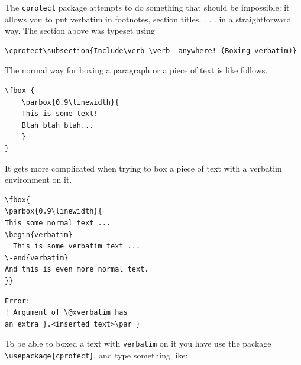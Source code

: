 \documentclass[12pt,a4paper]{article}
\theoremstyle{definition}
\theoremstyle{remark}
\newcommand{\bs}{\bigskip}
\newcommand{\tbs}{\textbackslash}
\begin{document}
The \texttt{cprotect} package attempts to do something that should be impossible: it allows you
to put verbatim in footnotes, section titles, . . . in a straightforward way. The section above was typeset using

\begin{verbatim}
\cprotect\subsection{Include\verb-\verb- anywhere! (Boxing verbatim)}
\end{verbatim}

The normal way for boxing a paragraph or a piece of text is like follows.
\bs

\begin{minipage}{0.45\textwidth}
\begin{verbatim}
\fbox {
    \parbox{0.9\linewidth}{
    This is some text!
    Blah blah blah...
    }
}
\end{verbatim}
\end{minipage}
\hfill\vline\hfill
\begin{minipage}[c]{0.3\textwidth}
\end{minipage}
\bs

It gets more complicated when trying to box a piece of text with a verbatim environment on it.
\bigskip 

\begin{minipage}{0.55\textwidth}
\begin{verbatim}
\fbox{
\parbox{0.9\linewidth}{
This some normal text ...
\begin{verbatim}
  This is some verbatim text ...
\-end{verbatim}
And this is even more normal text.
}}
\end{verbatim}
\end{minipage}
\vline\hfill
\begin{minipage}[c]{0.35\textwidth}
\begin{verbatim}
Error:
! Argument of \@xverbatim has
an extra }.<inserted text>\par }
\end{verbatim}
\end{minipage}
\bigskip

To be able to boxed a text with \texttt{verbatim} on it you have
use the package \texttt{\tbs usepackage\{cprotect\}}, and type something like: \bs
\end{document}
